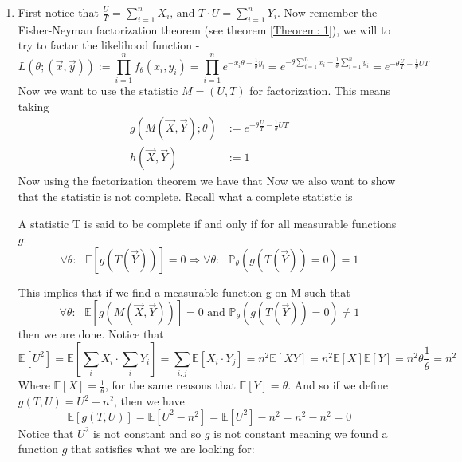 \documentclass[../main.tex]{subfiles}
\begin{document}
\begin{enumerate}
    \item First notice that $\frac{U}{T} = \sum_{i=1}^n X_i\text{, and } T\cdot U = \sum_{i=1}^n Y_i$. Now remember the Fisher-Neyman factorization theorem (see theorem \ref{Theorem: 1}), we will to try to factor the likelihood function -
    \[L(\theta; (\overrightarrow{x},\overrightarrow{y})):=\prod_{i=1}^n f_{\theta}(x_i,y_i) = \prod_{i=1}^n e^{-x_i\theta-\frac{1}{\theta} y_i} = e^{-\theta\sum_{i=1}^n x_i-\frac{1}{\theta}\sum_{i=1}^n y_i} = e^{-\theta\frac{U}{T} -\frac{1}{\theta} UT}\]
    Now we want to use the statistic $M= (U,T)$ for factorization. This means taking
    \begin{align*}g\left(M\left(\overrightarrow{X},\overrightarrow{Y}\right); \theta\right) &:= e^{-\theta\frac{U}{T} -\frac{1}{\theta} UT} \\ h\left(\overrightarrow{X},\overrightarrow{Y}\right)&:=1\end{align*}
    Now using the factorization theorem we have that  Now we also want to show that the statistic is not complete. Recall what a complete statistic is
    
    \begin{mdframed}[backgroundcolor=blue!20] 
        A statistic T is said to be complete if and only if for all measurable functions $g$:
        \[\forall\theta:\text{ } \mathbb{E}\left[g(T(\overrightarrow{Y}))\right]=0\Longrightarrow\forall\theta: \text{ }\mathbb{P}_\theta\left(g(T(\overrightarrow{Y}))=0\right)=1\]
    \end{mdframed}
    
    This implies that if we find a measurable function g on M such that
    \[\forall\theta:\text{ } \mathbb{E}\left[g(M(\overrightarrow{X}, \overrightarrow{Y}))\right]=0\text{ and  }\mathbb{P}_\theta\left(g(T(\overrightarrow{Y}))=0\right)\neq 1\]
    then we are done. Notice that
    \[\mathbb{E}\left[ U^2\right]= \mathbb{E}\left[\sum_i X_i\cdot \sum_i Y_i\right] = \sum_{i,j}\mathbb{E}[X_i\cdot Y_j] = n^2 \mathbb{E}[XY] = n^2\mathbb{E}[X]\mathbb{E}[Y] = n^2\theta\frac{1}{\theta} = n^2\]
    Where $\mathbb{E}[X]=\frac{1}{\theta}$, for the same reasons that $\mathbb{E}[Y] = \theta$. And so if we define $g(T,U)=U^2-n^2$, then we have
    \[\mathbb{E}\left[g\left(T,U\right)\right] = \mathbb{E}\left[U^2-n^2\right] = \mathbb{E}\left[U^2\right] - n^2 = n^2-n^2 = 0\]
    Notice that $U^2$ is not constant and so $g$ is not constant meaning we found a function $g$ that satisfies what we are looking for:  \qedsymbol 
    

\end{enumerate}
\end{document}
